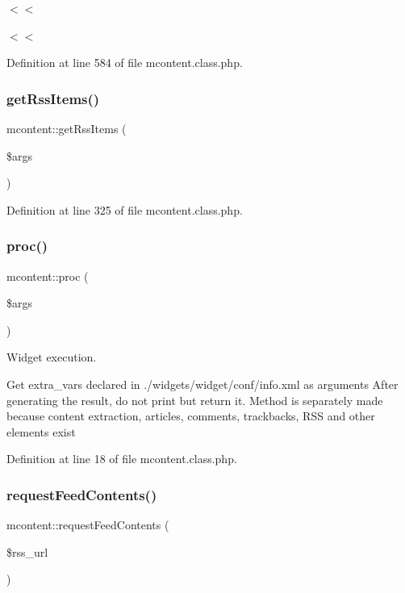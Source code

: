 $<$$<$

$<$$<$ 

Definition at line 584 of file mcontent.\+class.\+php.

\hypertarget{classmcontent_a4b6b633f77c7f2280e1a0fde292b8a62}{}\label{classmcontent_a4b6b633f77c7f2280e1a0fde292b8a62} 
\subsubsection{\texorpdfstring{get\+Rss\+Items()}{getRssItems()}}
{\footnotesize\ttfamily mcontent\+::get\+Rss\+Items (\begin{DoxyParamCaption}\item[{}]{\$args }\end{DoxyParamCaption})}



Definition at line 325 of file mcontent.\+class.\+php.

\hypertarget{classmcontent_abdf3692374f645c0a808db2225b9fec3}{}\label{classmcontent_abdf3692374f645c0a808db2225b9fec3} 
\subsubsection{\texorpdfstring{proc()}{proc()}}
{\footnotesize\ttfamily mcontent\+::proc (\begin{DoxyParamCaption}\item[{}]{\$args }\end{DoxyParamCaption})}



Widget execution. 

Get extra\+\_\+vars declared in ./widgets/widget/conf/info.xml as arguments After generating the result, do not print but return it. Method is separately made because content extraction, articles, comments, trackbacks, R\+SS and other elements exist

Definition at line 18 of file mcontent.\+class.\+php.

\hypertarget{classmcontent_a9c74009a166bfac6a467cb27bc2ad214}{}\label{classmcontent_a9c74009a166bfac6a467cb27bc2ad214} 
\subsubsection{\texorpdfstring{request\+Feed\+Contents()}{requestFeedContents()}}
{\footnotesize\ttfamily mcontent\+::request\+Feed\+Contents (\begin{DoxyParamCaption}\item[{}]{\$rss\+\_\+url }\end{DoxyParamCaption})}



